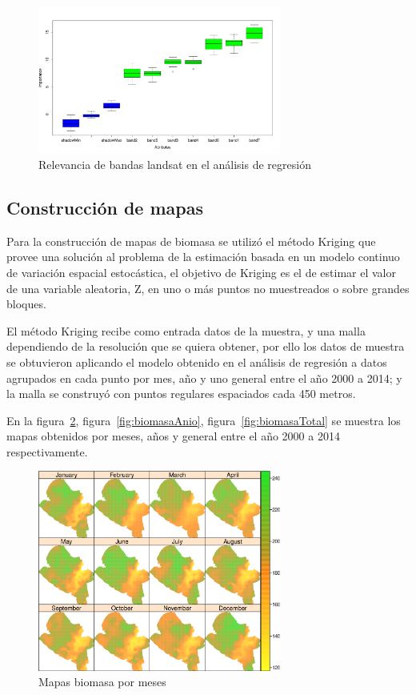 \begin{figure}
  \centering
  \includegraphics[width = 8cm]{boruta.pdf}
  \caption{Relevancia de bandas landsat en el análisis de regresión}
  \label{fig:boruta}
\end{figure}

\subsection{Construcción de mapas}

Para la construcción de mapas de biomasa se utilizó el método Kriging que provee una solución al problema 
de la estimación basada en un modelo continuo de variación espacial estocástica, el objetivo de Kriging es el de estimar el valor de una 
variable aleatoria, Z, en uno o más puntos no muestreados o sobre grandes bloques. 

El método Kriging recibe como entrada datos de la muestra, y una malla dependiendo de la resolución que se quiera obtener, por ello los datos de muestra se
obtuvieron aplicando el modelo obtenido en el análisis de regresión a datos agrupados en cada punto por mes, año y uno general entre el año 2000 a 2014; y la 
 malla se construyó con puntos regulares espaciados cada 450 metros. 
 
 En la figura~\ref{fig:biomasaMes}, figura~\ref{fig:biomasaAnio}, figura~\ref{fig:biomasaTotal}  se muestra los mapas obtenidos por meses, años y general entre el año 2000 a 2014 respectivamente. 
 
\begin{figure}
  \centering
  \includegraphics[width = 8cm]{mapMonthsBiomass.pdf}
  \caption{Mapas biomasa por meses}
  \label{fig:biomasaMes}
\end{figure}


